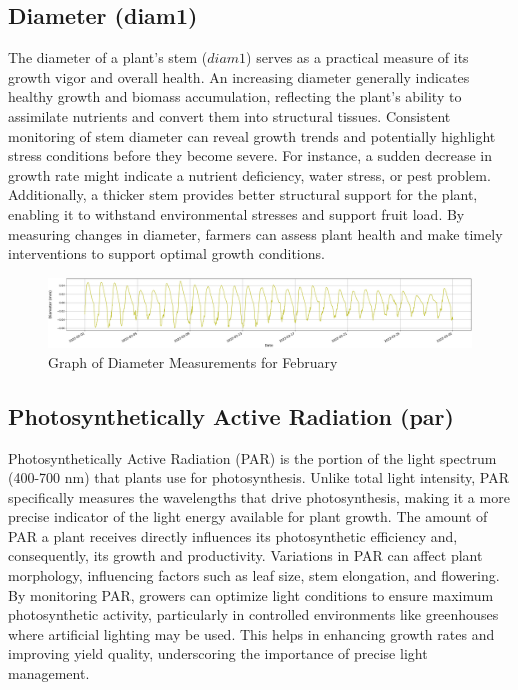 \subsection{Diameter (diam1)}

The diameter of a plant's stem (\( diam1 \)) serves as a practical measure of its growth vigor and overall health. An increasing diameter generally indicates healthy growth and biomass accumulation, reflecting the plant's ability to assimilate nutrients and convert them into structural tissues. Consistent monitoring of stem diameter can reveal growth trends and potentially highlight stress conditions before they become severe. For instance, a sudden decrease in growth rate might indicate a nutrient deficiency, water stress, or pest problem. Additionally, a thicker stem provides better structural support for the plant, enabling it to withstand environmental stresses and support fruit load. By measuring changes in diameter, farmers can assess plant health and make timely interventions to support optimal growth conditions.

\begin{figure}[htbp]
    \centering
    \includegraphics[width=15 cm]{4_ChapterMaterials/figuras/train_data_Diameter.pdf}
    \caption{Graph of Diameter Measurements for February}
    \end{figure}

\subsection{Photosynthetically Active Radiation (par)}

Photosynthetically Active Radiation (PAR) is the portion of the light spectrum (400-700 nm) that plants use for photosynthesis. Unlike total light intensity, PAR specifically measures the wavelengths that drive photosynthesis, making it a more precise indicator of the light energy available for plant growth. The amount of PAR a plant receives directly influences its photosynthetic efficiency and, consequently, its growth and productivity. Variations in PAR can affect plant morphology, influencing factors such as leaf size, stem elongation, and flowering. By monitoring PAR, growers can optimize light conditions to ensure maximum photosynthetic activity, particularly in controlled environments like greenhouses where artificial lighting may be used. This helps in enhancing growth rates and improving yield quality, underscoring the importance of precise light management.

